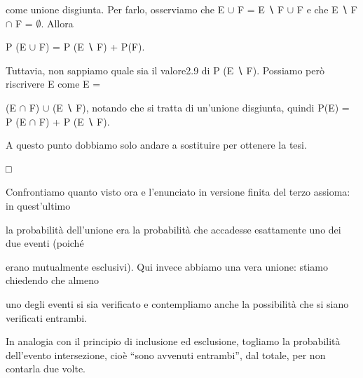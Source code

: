\documentclass[a4paper,portrait,12pt]{article}
\begin{document}
\begin{flushleft}
come unione disgiunta. Per farlo, osserviamo che E $\cup$ F = E ∖ F $\cup$ F e che E ∖ F $\cap$ F = $\emptyset$. Allora
\end{flushleft}





\begin{flushleft}
P (E $\cup$ F) = P (E ∖ F) + P(F).
\end{flushleft}


\begin{flushleft}
Tuttavia, non sappiamo quale sia il valore2.9 di P (E ∖ F). Possiamo per\`{o} riscrivere E come E =
\end{flushleft}


\begin{flushleft}
(E $\cap$ F) $\cup$ (E ∖ F), notando che si tratta di un'unione disgiunta, quindi P(E) = P (E $\cap$ F) + P (E ∖ F).
\end{flushleft}


\begin{flushleft}
A questo punto dobbiamo solo andare a sostituire per ottenere la tesi.
\end{flushleft}


□


\begin{flushleft}
Confrontiamo quanto visto ora e l'enunciato in versione finita del terzo assioma: in quest'ultimo
\end{flushleft}


\begin{flushleft}
la probabilit\`{a} dell'unione era la probabilit\`{a} che accadesse esattamente uno dei due eventi (poich\'{e}
\end{flushleft}


\begin{flushleft}
erano mutualmente esclusivi). Qui invece abbiamo una vera unione: stiamo chiedendo che almeno
\end{flushleft}


\begin{flushleft}
uno degli eventi si sia verificato e contempliamo anche la possibilit\`{a} che si siano verificati entrambi.
\end{flushleft}


\begin{flushleft}
In analogia con il principio di inclusione ed esclusione, togliamo la probabilit\`{a} dell'evento intersezione, cio\`{e} {``}sono avvenuti entrambi'', dal totale, per non contarla due volte.
\end{flushleft}
\end{document}
